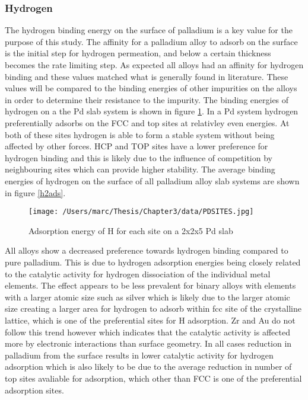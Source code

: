 \subsubsection{Hydrogen}
The hydrogen binding energy on the surface of palladium is a key value for the purpose of this study. The affinity for a palladium alloy to adsorb on the surface is the initial step for hydrogen permeation, and below a certain thickness becomes the rate limiting step. As expected all alloys had an affinity for hydrogen binding and these values matched what is generally found in literature. These values will be compared to the binding energies of other impurities on the alloys in order to determine their resistance to the impurity. The binding energies of hydrogen on a the Pd slab system is shown in figure \ref{Pdsite}. In a Pd system hydrogen preferentially adsorbs on the FCC and top sites at relativley even energies. At both of these sites hydrogen is able to form a stable system without being affected by other forces. HCP and TOP sites have a lower preference for hydrogen binding and this is likely due to the influence of competition by neighbouring sites which can provide higher stability. The average binding energies of hydrogen on the surface of all palladium alloy slab systems are shown in figure \ref{h2ads}.

\begin{figure}
  \centering
  \texttt{[image: /Users/marc/Thesis/Chapter3/data/PDSITES.jpg]}
  \caption{Adsorption energy of H for each site on a 2x2x5 Pd slab}
  \label{Pdsite}
\end{figure}

All alloys show a decreased preference towards hydrogen binding compared to pure palladium. This is due to hydrogen adsorption energies being closely related to the catalytic activity for hydrogen dissociation of the individual metal elements. The effect appears to be less prevalent for binary alloys with elements with a larger atomic size such as silver which is likely due to the larger atomic size creating a larger area for hydrogen to adsorb within fcc site of the crystalline lattice, which is one of the preferential sites for H adsorption. Zr and Au do not follow this trend however which indicates that the catalytic activity is affected more by electronic interactions than surface geometry. In all cases reduction in palladium from the surface results in lower catalytic activity for hydrogen adsorption which is also likely to be due to the average reduction in number of top sites avaliable for adsorption, which other than FCC is one of the preferential adsorption sites. 

